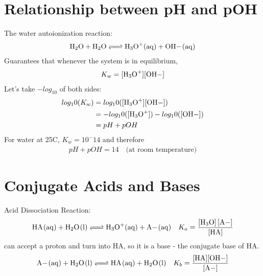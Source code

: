 \documentclass{article}  %
\begin{document}
\section*{Relationship between pH and pOH}
The water autoionization reaction:
\begin{equation*}
    \begin{aligned}
        \ce{H2O + H2O <=> H3O+_(aq) + OH-_(aq)}
    \end{aligned}
\end{equation*}
Guarantees that whenever the system is in equilibrium,
\begin{equation*}
    \begin{aligned}
        K_w = \ce{[H3O+][OH-]}
    \end{aligned}
\end{equation*}
Let's take $-log_10$ of both sides:
\begin{equation*}
    \begin{aligned}
        log_10(K_w) &= log_10(\ce{[H3O+][OH-]}) \\
                    &= -log_10(\ce{[H3O+]}) - log_10(\ce{[OH-]}) \\
                    &= pH + pOH
    \end{aligned}
\end{equation*}
For water at 25C, $K_w = 10^-14$ and therefore
\begin{equation*}
    \begin{aligned}
        pH + pOH = 14 \quad \text{(at room temperature)}
    \end{aligned}
\end{equation*}

\section*{Conjugate Acids and Bases}
Acid Dissociation Reaction:
\begin{equation*}
    \begin{aligned}
        \ce{HA_(aq) + H2O_(l) <=> H3O+_(aq) + A-_(aq)} \quad K_a = \ce{\frac{[H3O] [A-]}{[HA]}}
    \end{aligned}
\end{equation*}
 can accept a proton and turn into HA, so it is a base - the conjugate base of HA.
\begin{equation*}
    \begin{aligned}
        \ce{A-_(aq) + H2O_(l) <=> HA_(aq) + H2O_(l) } \quad K_b = \ce{\frac{[HA][OH-]}{[A-]}}
    \end{aligned}
\end{equation*}
\end{document}
